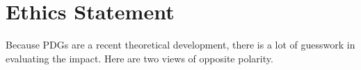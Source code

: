 \documentclass[letterpaper]{article} %
\theoremstyle{plain}
\theoremstyle{definition}
\theoremstyle{remark}
\newcommand{\todo}[1]{{\color{red}\ \!\Large\smash{\textbf{[}}{\normalsize\textsc{todo:} #1}\ \!\smash{\textbf{]}}}}
\begin{document}
	



{
            
}

	\section*{Ethics Statement}
Because PDGs are a recent theoretical development, there is a lot of
guesswork in evaluating the impact. Here are two views of
opposite polarity.
\end{document}
